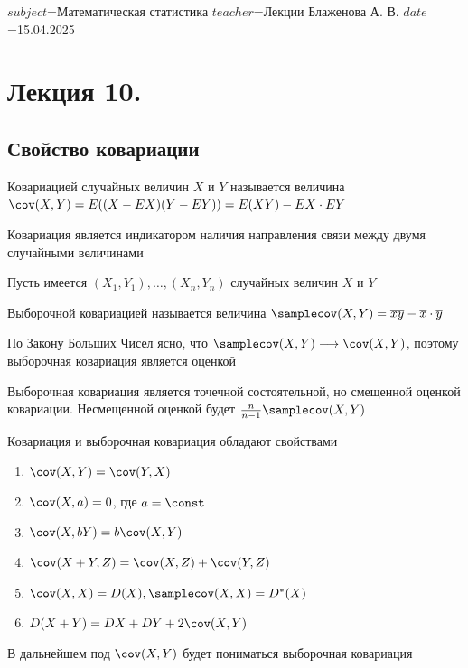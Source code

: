 $subject$=Математическая статистика
$teacher$=Лекции Блаженова А. В.
$date$=15.04.2025

\section{Лекция 10.}

\subsection{Свойство ковариации}

\Mem Ковариацией случайных величин $X$ и $Y$ называется величина $\cov (X, Y) = E((X - EX)(Y - EY)) = E(XY) - EX \cdot EY$

Ковариация является индикатором наличия направления связи между двумя случайными величинами

Пусть имеется $(X_1, Y_1), \dots, (X_n, Y_n)$ случайных величин $X$ и $Y$

\Def Выборочной ковариацией называется величина $\samplecov (X, Y) = \overline{xy} - \overline{x} \cdot \overline{y}$

По Закону Больших Чисел ясно, что $\samplecov (X, Y) \longrightarrow \cov (X, Y)$, поэтому выборочная ковариация является оценкой

\begin{MyTheorem}
    \Ths Выборочная ковариация является точечной состоятельной, но смещенной оценкой ковариации. 
    Несмещенной оценкой будет $\frac{n}{n - 1} \samplecov (X, Y)$
\end{MyTheorem}

Ковариация и выборочная ковариация обладают свойствами

\begin{enumerate}
    \item $\cov (X, Y) = \cov (Y, X)$
    \item $\cov (X, a) = 0$, где $a = \const$
    \item $\cov (X, bY) = b \cov (X, Y)$
    \item $\cov (X + Y, Z) = \cov (X, Z) + \cov (Y, Z)$
    \item $\cov (X, X) = D(X), \samplecov (X, X) = D^* (X)$
    \item $D(X + Y) = DX + DY + 2\cov (X, Y)$
\end{enumerate}

\Nota В дальнейшем под $\cov (X, Y)$ будет пониматься выборочная ковариация

\hypertarget{linear_regression_hypothesis}{}

